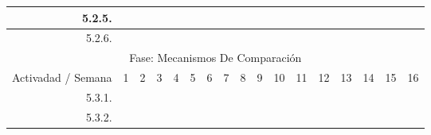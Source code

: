\documentclass[12pt]{article}
\begin{document}
\begin{table}[H]
{\begin{tabular}{|rllllllllllllllll|}
        \multicolumn{1}{|r|}{5.2.5.} & \multicolumn{1}{l|}{} & \multicolumn{1}{l|}{} & \multicolumn{1}{l|}{} & \multicolumn{1}{c|}{\cellcolor[HTML]{B6D7A8}} & \multicolumn{1}{c|}{\cellcolor[HTML]{A4C2F4}} & \multicolumn{1}{c|}{\cellcolor[HTML]{A4C2F4}} & \multicolumn{1}{c|}{\cellcolor[HTML]{A4C2F4}} & \multicolumn{1}{l|}{} & \multicolumn{1}{l|}{} & \multicolumn{1}{l|}{} & \multicolumn{1}{l|}{} & \multicolumn{1}{l|}{} & \multicolumn{1}{l|}{} & \multicolumn{1}{l|}{} & \multicolumn{1}{l|}{} &  \\ \hline
        \multicolumn{1}{|r|}{5.2.6.} & \multicolumn{1}{l|}{} & \multicolumn{1}{l|}{} & \multicolumn{1}{l|}{} & \multicolumn{1}{l|}{} & \multicolumn{1}{l|}{} & \multicolumn{1}{l|}{} & \multicolumn{1}{c|}{\cellcolor[HTML]{A4C2F4}} & \multicolumn{1}{l|}{} & \multicolumn{1}{l|}{} & \multicolumn{1}{l|}{} & \multicolumn{1}{l|}{} & \multicolumn{1}{l|}{} & \multicolumn{1}{l|}{} & \multicolumn{1}{l|}{} & \multicolumn{1}{l|}{} &  \\ \hline
        \multicolumn{17}{|c|}{\cellcolor[HTML]{D9D9D9}Fase: Mecanismos De Comparación} \\ \hline
        \multicolumn{1}{|l|}{\cellcolor[HTML]{D9D9D9}Activadad / Semana} & \multicolumn{1}{c|}{\cellcolor[HTML]{B6D7A8}1} & \multicolumn{1}{c|}{\cellcolor[HTML]{B6D7A8}2} & \multicolumn{1}{c|}{\cellcolor[HTML]{B6D7A8}3} & \multicolumn{1}{c|}{\cellcolor[HTML]{B6D7A8}4} & \multicolumn{1}{c|}{\cellcolor[HTML]{A4C2F4}5} & \multicolumn{1}{c|}{\cellcolor[HTML]{A4C2F4}6} & \multicolumn{1}{c|}{\cellcolor[HTML]{A4C2F4}7} & \multicolumn{1}{c|}{\cellcolor[HTML]{A4C2F4}8} & \multicolumn{1}{c|}{\cellcolor[HTML]{B4A7D6}9} & \multicolumn{1}{c|}{\cellcolor[HTML]{B4A7D6}10} & \multicolumn{1}{c|}{\cellcolor[HTML]{B4A7D6}11} & \multicolumn{1}{c|}{\cellcolor[HTML]{B4A7D6}12} & \multicolumn{1}{c|}{\cellcolor[HTML]{EA9999}13} & \multicolumn{1}{c|}{\cellcolor[HTML]{EA9999}14} & \multicolumn{1}{c|}{\cellcolor[HTML]{EA9999}15} & \multicolumn{1}{c|}{\cellcolor[HTML]{EA9999}16} \\ \hline
        \multicolumn{1}{|r|}{5.3.1.} & \multicolumn{1}{l|}{} & \multicolumn{1}{l|}{} & \multicolumn{1}{l|}{} & \multicolumn{1}{l|}{} & \multicolumn{1}{l|}{} & \multicolumn{1}{l|}{} & \multicolumn{1}{c|}{\cellcolor[HTML]{A4C2F4}} & \multicolumn{1}{l|}{} & \multicolumn{1}{l|}{} & \multicolumn{1}{l|}{} & \multicolumn{1}{l|}{} & \multicolumn{1}{l|}{} & \multicolumn{1}{l|}{} & \multicolumn{1}{l|}{} & \multicolumn{1}{l|}{} &  \\ \hline
        \multicolumn{1}{|r|}{5.3.2.} & \multicolumn{1}{l|}{} & \multicolumn{1}{l|}{} & \multicolumn{1}{l|}{} & \multicolumn{1}{l|}{} & \multicolumn{1}{l|}{} & \multicolumn{1}{l|}{} & \multicolumn{1}{c|}{\cellcolor[HTML]{A4C2F4}} & \multicolumn{1}{c|}{\cellcolor[HTML]{A4C2F4}} & \multicolumn{1}{c|}{\cellcolor[HTML]{A4C2F4}} & \multicolumn{1}{l|}{} & \multicolumn{1}{l|}{} & \multicolumn{1}{l|}{} & \multicolumn{1}{l|}{} & \multicolumn{1}{l|}{} & \multicolumn{1}{l|}{} &  \\ \hline

\end{tabular}}
\end{table}
\end{document}
